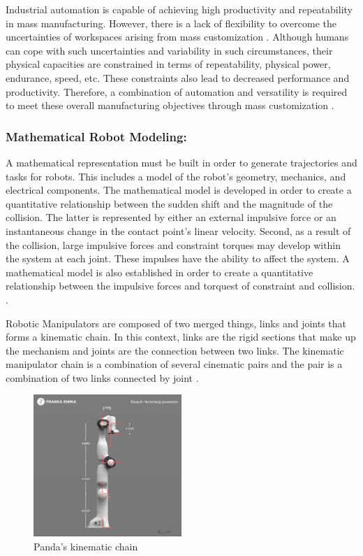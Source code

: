 Industrial automation is capable of achieving high productivity and repeatability in mass manufacturing. However, there is a lack of flexibility to overcome the uncertainties of workspaces arising from mass customization \cite{accorsi_application_2019}. Although humans can cope with such uncertainties and variability in such circumstances, their physical capacities are constrained in terms of repeatability, physical power, endurance, speed, etc. These constraints also lead to decreased performance and productivity. Therefore, a combination of automation and versatility is required to meet these overall manufacturing objectives through mass customization \cite{el_zaatari_cobot_2019}.   

\subsubsection*{Mathematical Robot Modeling:}
A mathematical representation must be built in order to generate trajectories and tasks for robots. This includes a model of the robot's geometry, mechanics, and electrical components. The mathematical model is developed in order to create a quantitative relationship between the sudden shift and the magnitude of the collision. The latter is represented by either an external impulsive force or an instantaneous change in the contact point's linear velocity. Second, as a result of the collision, large impulsive forces and constraint torques may develop within the system at each joint. These impulses have the ability to affect the system. A mathematical model is also established in order to create a quantitative relationship between the impulsive forces and torquest of constraint and collision.  \cite{zheng_mathematical_1985}.

Robotic Manipulators are composed of two merged things, links and joints that forms a kinematic chain. In this context, links are the rigid sections that make up the mechanism and joints are the connection between two links. The kinematic manipulator chain is a combination of several cinematic pairs and the pair is a combination of two links connected by joint \cite{al-naimi_robotics_nodate}.

\begin{figure}[h]
    \centering
    \includegraphics[width=0.5\textwidth]{graphics/pandakinematicchain.png}
    \caption{Panda’s kinematic chain \cite{noauthor_robot_nodate}}
    \label{fig:pandachain}
\end{figure}

